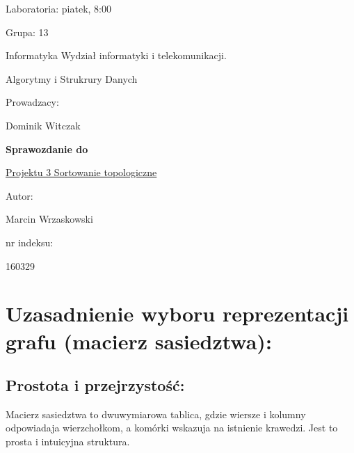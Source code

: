 \documentclass[12pt]{article}
\begin{document}
\begin{flushright}

Laboratoria: piatek, 8:00

Grupa: 13

Informatyka Wydział informatyki i telekomunikacji.

\end{flushright}

\hspace{4cm}

\begin{center}

Algorytmy i Strukrury Danych

Prowadzacy:

Dominik Witczak

\end{center}

\hspace{4cm}

\begin{center}

\textbf{Sprawozdanie do \LARGE}

\hspace{2cm}

\underline{Projektu 3 Sortowanie topologiczne}

\end{center}

\hspace{30cm}

\begin{flushright}

Autor:

Marcin Wrzaskowski

nr indeksu:

160329

\end{flushright}

\pagebreak

\section{Uzasadnienie wyboru reprezentacji grafu (macierz sasiedztwa): }

    \subsection{Prostota i przejrzystość:}
        Macierz sasiedztwa to dwuwymiarowa tablica, gdzie wiersze i kolumny odpowiadaja wierzchołkom, a komórki wskazuja na istnienie krawedzi. Jest to prosta i intuicyjna struktura.
\end{document}
